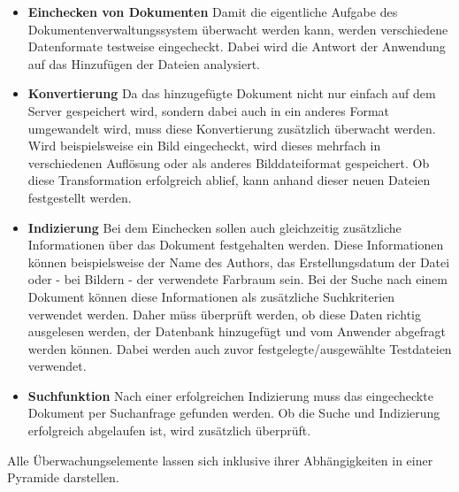 \begin{itemize}

\item \textbf{Einchecken von Dokumenten} Damit die eigentliche Aufgabe des Dokumentenverwaltungssystem überwacht werden kann, werden verschiedene Datenformate testweise eingecheckt. 
Dabei wird die Antwort der Anwendung auf das Hinzufügen der Dateien analysiert.

\item \textbf{Konvertierung} Da das hinzugefügte Dokument nicht nur einfach auf dem Server gespeichert wird, sondern dabei auch in ein anderes Format umgewandelt wird, muss diese Konvertierung zusätzlich überwacht werden. 
Wird beispielsweise ein Bild eingecheckt, wird dieses mehrfach in verschiedenen Auflösung oder als anderes Bilddateiformat gespeichert. 
Ob diese Transformation erfolgreich ablief, kann anhand dieser neuen Dateien festgestellt werden.

\item \textbf{Indizierung} Bei dem Einchecken sollen auch gleichzeitig zusätzliche Informationen über das Dokument festgehalten werden. 
Diese Informationen können beispielsweise der Name des Authors, das Erstellungsdatum der Datei oder - bei Bildern - der verwendete Farbraum sein. 
Bei der Suche nach einem Dokument können diese Informationen als zusätzliche Suchkriterien verwendet werden.
Daher müss überprüft werden, ob diese Daten richtig ausgelesen werden, der Datenbank hinzugefügt und vom Anwender abgefragt werden können. Dabei werden auch zuvor festgelegte/ausgewählte Testdateien verwendet.

\item \textbf{Suchfunktion} Nach einer erfolgreichen Indizierung muss das eingecheckte Dokument per Suchanfrage gefunden werden.
Ob die Suche und Indizierung erfolgreich abgelaufen ist, wird zusätzlich überprüft. 
\end{itemize}

Alle Überwachungselemente lassen sich inklusive ihrer Abhängigkeiten in einer Pyramide darstellen.

